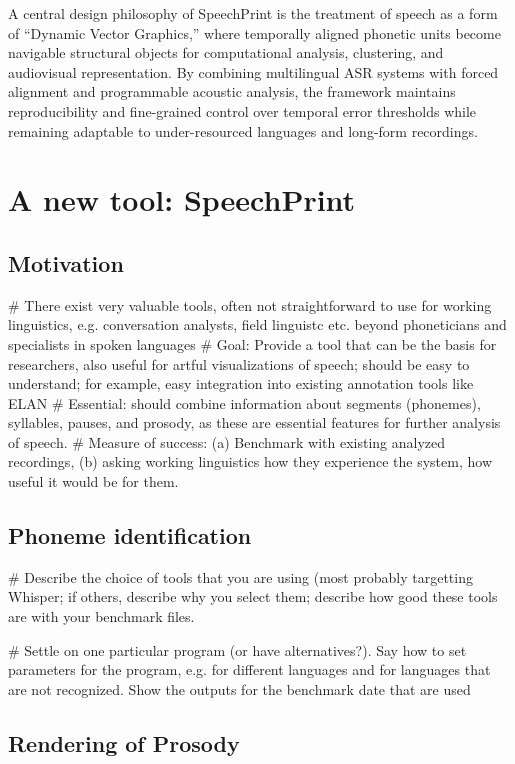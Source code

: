 A central design philosophy of SpeechPrint is the treatment of speech as a form of ``Dynamic Vector Graphics,'' where temporally aligned phonetic units become navigable structural objects for computational analysis, clustering, and audiovisual representation. By combining multilingual ASR systems with forced alignment and programmable acoustic analysis, the framework maintains reproducibility and fine-grained control over temporal error thresholds while remaining adaptable to under-resourced languages and long-form recordings.


\chapter{A new tool: SpeechPrint}
\label{speechprint}

\section{Motivation}

# There exist very valuable tools, often not straightforward to use for working linguistics, e.g. conversation analysts, field linguistc etc. beyond phoneticians and specialists in spoken languages
# Goal: Provide a tool that can be the basis for researchers, also useful for artful visualizations of speech; should be easy to understand; for example, easy integration into existing annotation tools like ELAN
# Essential: should combine information about segments (phonemes), syllables, pauses, and prosody, as these are essential features for further analysis of speech. 
# Measure of success: (a) Benchmark with existing analyzed recordings, (b) asking working linguistics how they experience the system, how useful it would be for them. 

\section{Phoneme identification}

# Describe the choice of tools that you are using (most probably targetting Whisper; if others, describe why you select them; describe how good these tools are with your benchmark files. 

# Settle on one particular program (or have alternatives?). Say how to set parameters for the program, e.g. for different languages and for languages that are not recognized. Show the outputs for the benchmark date that are used

\section{Rendering of Prosody}

